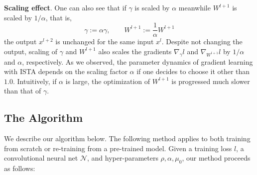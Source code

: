 \documentclass{article} %
\begin{document}
\textbf{Scaling effect}.
One can also see that if $\gamma$ is scaled by $\alpha$ meanwhile $W^{l+1}$ is scaled by $1/\alpha$, that is,
\[\gamma :=  \alpha \gamma, \qquad  W^{l+1}:= \frac{1}{\alpha} W^{l+1}\]
the output $x^{l+2}$ is unchanged for the same input $x^l$. Despite not changing the output,
scaling of $\gamma$ and $W^{l+1}$ also scales the gradients $\nabla_\gamma l$ and $\nabla_{W^{l+1}} l$
by $1/\alpha$ and $\alpha$, respectively. As we observed, the parameter dynamics of gradient learning with ISTA depends on
the scaling factor $\alpha$ if one decides to choose it other than $1.0$.
Intuitively, if $\alpha$ is large, the optimization of $W^{l+1}$ is progressed much slower than 
that of $\gamma$. 

\subsection{The Algorithm}
We describe our algorithm below. The following method applies to both
training from scratch or re-training from a pre-trained model.
Given a training loss $l$, a convolutional neural net $\mathcal N$,
and hyper-parameters $\rho, \alpha, \mu_0$, our method proceeds as follows:
\end{document}
